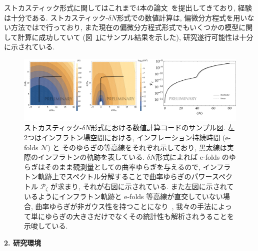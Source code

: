 \documentclass[11pt,a4j,dvipdfmx]{jarticle} 					%
\newcommand{\研究課題名}{\mgfamily\sffamily ストカスティック形式で迫る重力と量子論}
\newcommand{\研究機関名}{\mgfamily\sffamily 名古屋大学}
\newcommand{\研究代表者氏名}{\mgfamily\sffamily 多田祐一郎}
\newcommand{\研究期間の最終元号年度}{34}  %
\begin{document}
ストカスティック形式に関してはこれまで4本の論文~\cite{Fujita:2013cna-2,Fujita:2014tja,Kawasaki:2015ppx-2,Pinol:2018euk-2}を提出してきており,
経験は十分である. ストカスティック-$\delta N$形式での数値計算は, 偏微分方程式を用いない方法では\cite{Fujita:2014tja,Kawasaki:2015ppx-2}で行っており,
また現在の偏微分方程式形式でもいくつかの模型に関して計算に成功していて (図~\ref{fig: StocDeltaN}にサンプル結果を示した), 研究遂行可能性は十分に示されている.

\begin{figure}[htbp]
	\centering
	\includegraphics[width=\hsize]{figs/sample_plots.png}
	\caption{ストカスティック-$\delta N$形式における数値計算コードのサンプル図. 左2つはインフラトン場空間における, インフレーション持続時間 (e-folds $\mathcal{N}$) と
	そのゆらぎの等高線をそれぞれ示しており, 黒太線は実際のインフラトンの軌跡を表している. $\delta N$形式によれば e-folds のゆらぎはそのまま観測量としての曲率ゆらぎを与えるので,
	インフラトン軌跡上でスペクトル分解することで曲率ゆらぎのパワースペクトル $\mathcal{P}_\zeta$ が求まり, それが右図に示されている.
	また左図に示されているようにインフラトン軌跡と e-folds 等高線が直交していない場合, 曲率ゆらぎが非ガウス性を持つことになり~\cite{Tada:2016pmk}, 
	我々の手法によって単にゆらぎの大きさだけでなくその統計性も解析されうることを示唆している.}
	\label{fig: StocDeltaN}
\end{figure}


\begin{mdframed}[roundcorner=0.5zw,
	innertopmargin=0.8zw,innerbottommargin=0.8zw,
	linecolor=black!50,linewidth=0.2zw,
	backgroundcolor=black!10]
	{\bfseries\gtfamily\sffamily\large 2. 研究環境}
\end{mdframed}
\end{document}
